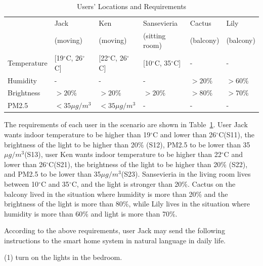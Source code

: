 \begin{table}[htbp]
	\centering  %
	\caption{Users' Locations and Requirements}
	\label{table3}
	\renewcommand\arraystretch{1.5}  %
	\begin{tabular}{p{2cm}<{\centering} p{2cm}<{\centering} p{2cm}<{\centering} p{2.5cm}<{\centering} p{2cm}<{\centering} p{2cm}<{\centering}}  %
		\toprule[1.5pt]
		& Jack & Ken & Sansevieria & Cactus & Lily\\
		& (moving) & (moving) & (sitting room) & (balcony) & (balcony)\\
		
		\midrule[1.5pt]
		
		Temperature & [19$^\circ$C, 26$^\circ$C] & [22$^\circ$C, 26$^\circ$C] & [10$^\circ$C, 35$^\circ$C] & - & -\\ %
		
		Humidity    & - & - & - & $>20\%$ & $>60\%$ \\
		
		Brightness  & $>20\%$ & $>20\%$ & $>20\%$ & $>80\%$ & $>70\%$ \\
		
		PM2.5       & $<35\mu g/m^3$ & $<35\mu g/m^3$ & - & - & -\\ %
		
		\bottomrule[1.5pt]
	\end{tabular}
\end{table}

The requirements of each user in the scenario are shown in Table~\ref{table3}. User Jack wants indoor temperature to be higher than 19$^\circ$C and lower than 26$^\circ$C(S11), the brightness of the light to be higher than 20\% (S12), PM2.5 to be lower than 35$\mu g/m^3$(S13), user Ken wants indoor temperature to be higher than 22$^\circ$C and lower than 26$^\circ$C(S21), the brightness of the light to be higher than 20\% (S22), and PM2.5 to be lower than 35$\mu g/m^3$(S23).  Sansevieria in the living room lives between 10$^\circ$C and 35$^\circ$C, and the light is stronger than 20\%. Cactus on the balcony lived in the situation where humidity is more than 20\% and the brightness of the light is more than 80\%, while Lily lives in the situation where humidity is more than 60\% and light is more than 70\%.

According to the above requirements, user Jack may send the following instructions to the smart home system in natural language in daily life.

(1) turn on the lights in the bedroom.

